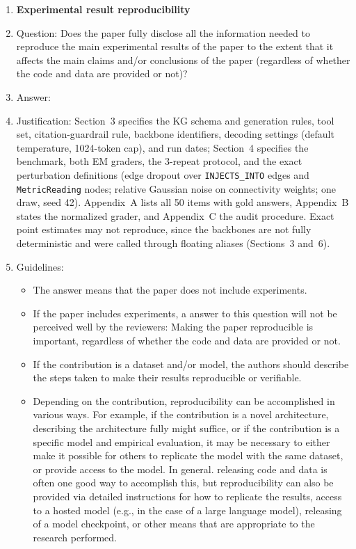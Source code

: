\begin{enumerate}
    \item {\bf Experimental result reproducibility}
    \item[] Question: Does the paper fully disclose all the information needed to reproduce the main experimental results of the paper to the extent that it affects the main claims and/or conclusions of the paper (regardless of whether the code and data are provided or not)?
    \item[] Answer: \answerYes{}
    \item[] Justification: Section~3 specifies the KG schema and generation rules, tool set, citation-guardrail rule, backbone identifiers, decoding settings (default temperature, 1024-token cap), and run dates; Section~4 specifies the benchmark, both EM graders, the 3-repeat protocol, and the exact perturbation definitions (edge dropout over \texttt{INJECTS\_INTO} edges and \texttt{MetricReading} nodes; relative Gaussian noise on connectivity weights; one draw, seed 42). Appendix~A lists all 50 items with gold answers, Appendix~B states the normalized grader, and Appendix~C the audit procedure. Exact point estimates may not reproduce, since the backbones are not fully deterministic and were called through floating aliases (Sections~3 and~6).
    \item[] Guidelines:
    \begin{itemize}
        \item The answer \answerNA{} means that the paper does not include experiments.
        \item If the paper includes experiments, a \answerNo{} answer to this question will not be perceived well by the reviewers: Making the paper reproducible is important, regardless of whether the code and data are provided or not.
        \item If the contribution is a dataset and\slash or model, the authors should describe the steps taken to make their results reproducible or verifiable. 
        \item Depending on the contribution, reproducibility can be accomplished in various ways. For example, if the contribution is a novel architecture, describing the architecture fully might suffice, or if the contribution is a specific model and empirical evaluation, it may be necessary to either make it possible for others to replicate the model with the same dataset, or provide access to the model. In general. releasing code and data is often one good way to accomplish this, but reproducibility can also be provided via detailed instructions for how to replicate the results, access to a hosted model (e.g., in the case of a large language model), releasing of a model checkpoint, or other means that are appropriate to the research performed.

\end{itemize}
\end{enumerate}
